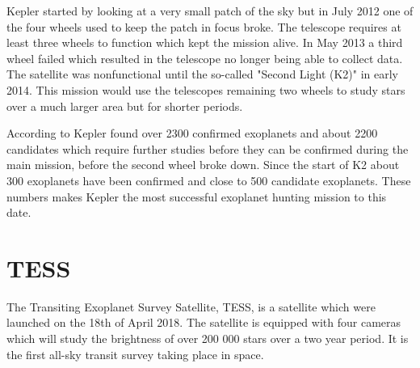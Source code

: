 \documentclass[12pt]{report}
\begin{document}
	Kepler started by looking at a very small patch of the sky but in July 2012 one of the four wheels used to keep the patch in focus broke. The telescope requires at least three wheels to function which kept the mission alive. In May 2013 a third wheel failed which resulted in the telescope no longer being able to collect data. The satellite was nonfunctional until the so-called "Second Light (K2)" in early 2014. This mission would use the telescopes remaining two wheels to study stars over a much larger area but for shorter periods.
	
	According to \cite{kepler_num_planet} Kepler found over 2300 confirmed exoplanets and about 2200 candidates which require further studies before they can be confirmed during the main mission, before the second wheel broke down. Since the start of K2 about 300 exoplanets have been confirmed and close to 500 candidate exoplanets. These numbers makes Kepler the most successful exoplanet hunting mission to this date.
	
	
\section{TESS}
	The Transiting Exoplanet Survey Satellite, TESS, is a satellite which were launched on the 18th of April 2018. The satellite is equipped with four cameras which will study the brightness of over 200 000 stars over a two year period. It is the first all-sky transit survey taking place in space.
	
\end{document}
